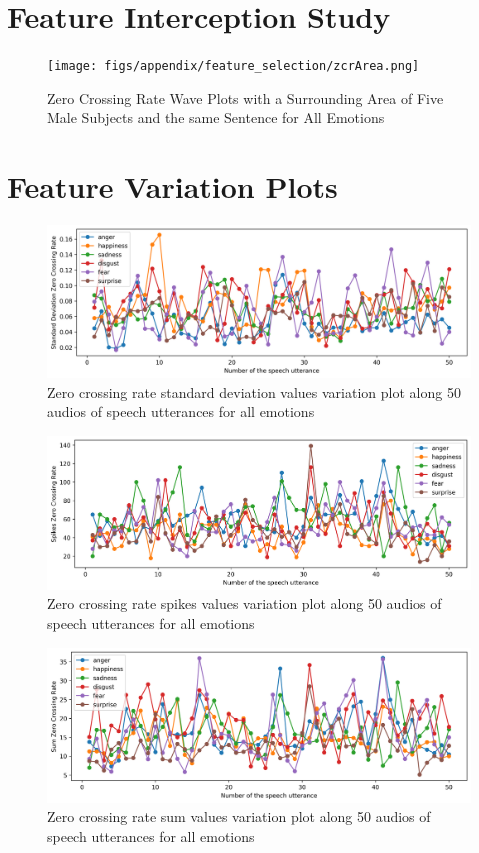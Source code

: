 \section{Feature Interception Study}


\begin{figure}[H]
	\centering
	\texttt{[image: figs/appendix/feature\_selection/zcrArea.png]}
	\caption{Zero Crossing Rate Wave Plots with a Surrounding Area of Five Male Subjects and the same Sentence for All Emotions}
	\label{fig:zcrArea}
\end{figure}

\section{Feature Variation Plots}

\begin{figure}[H]
	\centering
	\includegraphics[width=.8\linewidth]{figs/appendix/feature_selection/stdZCRVar.png}
	\caption{Zero crossing rate standard deviation values variation plot along 50 audios of speech utterances for all emotions}
	\label{fig:stdZCRVar}
\end{figure}

\begin{figure}[H]
	\centering
	\includegraphics[width=.8\linewidth]{figs/appendix/feature_selection/spikesZCRVar.png}
	\caption{Zero crossing rate spikes values variation plot along 50 audios of speech utterances for all emotions}
	\label{fig:spikesZCRVar}
\end{figure}

\begin{figure}[H]
	\centering
	\includegraphics[width=.8\linewidth]{figs/appendix/feature_selection/sumZCRVar.png}
	\caption{Zero crossing rate sum values variation plot along 50 audios of speech utterances for all emotions}
	\label{fig:sumZCRVar}
\end{figure}



